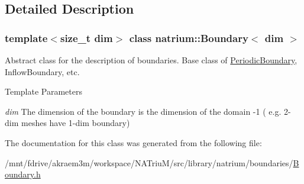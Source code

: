 \subsection{Detailed Description}
\subsubsection*{template$<$size\_\-t dim$>$ class natrium::Boundary$<$ dim $>$}

Abstract class for the description of boundaries. Base class of \hyperlink{classnatrium_1_1PeriodicBoundary}{PeriodicBoundary}, InflowBoundary, etc. 
\begin{DoxyTemplParams}{Template Parameters}
\item[{\em dim}]The dimension of the boundary is the dimension of the domain -\/1 ( e.g. 2-\/dim meshes have 1-\/dim boundary) \end{DoxyTemplParams}


The documentation for this class was generated from the following file:\begin{DoxyCompactItemize}
\item 
/mnt/fdrive/akraem3m/workspace/NATriuM/src/library/natrium/boundaries/\hyperlink{Boundary_8h}{Boundary.h}\end{DoxyCompactItemize}
